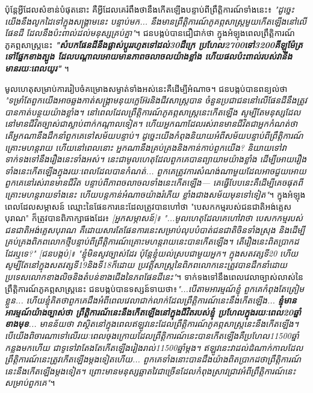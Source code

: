 \documentclass[10pt,twocolumn,letterpaper]{article}
\begin{document}
	ប៉ុន្តែអ្វីដែលសំខាន់បំផុតនោះ គឺអ្វីដែលគេរំពឹងថានឹងកើតឡើងបន្ទាប់ពីព្រឹត្តិការណ៍ទាំងនេះ៖ \textit{"ដូច្នេះយើងនឹងលូកដៃទៅក្នុងសង្គ្រាមនេះ បន្ទាប់មក... នឹងមានព្រឹត្តិការណ៍ភូគព្ភសាស្ត្រមួយកើតឡើងនៅលើផែនដី ដែលនឹងប៉ះពាល់ដល់មនុស្សគ្រប់គ្នា"}\cite{4}។ ជនបង្កប់បានជឿជាក់ថា ក្នុងអំឡុងពេលព្រឹត្តិការណ៍ភូគព្ភសាស្ត្រនេះ \textit{\textbf{"សំបកផែនដីនឹងផ្លាស់ប្តូររហូតទៅដល់30ដឺក្រេ ប្រហែល2700ទៅ3200គីឡូម៉ែត្រទៅផ្នែកខាងត្បូង ដែលបណ្តាលអោយមានភាពចលាចលយ៉ាងខ្លាំង ហើយផលប៉ះពាល់របស់វានឹងមានរយៈពេលយូរ" }}\cite{4}។

	មូលហេតុសម្រាប់ការរៀបចំគម្រោងសម្ងាត់ទាំងអស់នេះគឺដើម្បីអំណាច។ ជនបង្កប់បានពន្យល់ថា \textit{"ទម្រាំតែពួកយើងអាចឆ្លងកាត់សង្គ្រាមនុយក្លេអ៊ែរនិងជីវសាស្ត្របាន ចំនួនប្រជាជននៅលើផែនដីនឹងត្រូវបានកាត់បន្ថយយ៉ាងខ្លាំង។ នៅពេលដែលព្រឹត្តិការណ៍ភូគព្ភសាស្ត្រនេះកើតឡើង សូម្បីតែមនុស្សដែលនៅមានជីវិតច្បាស់ជាស្លាប់ពាក់កណ្តាលទៀត។ ហើយអ្នកណាដែលរស់រានមានជីវិតជាអ្នកកំណត់ថា តើអ្នកណានឹងដឹកនាំពួកគេទៅសម័យបន្ទាប់។ ដូច្នេះយើងកំពុងនិយាយអំពីសម័យបន្ទាប់ពីព្រឹត្តិការណ៍គ្រោះមហន្តរាយ ហើយនៅពេលនោះ អ្នកណានឹងគ្រប់គ្រងនិងកាន់កាប់ពួកយើង? និយាយទៅវាទាក់ទងទៅនឹងរឿងនេះទាំងអស់។ នេះជាមូលហេតុដែលពួកគេបានព្យាយាមយ៉ាងខ្លាំង ដើម្បីអោយរឿងទាំងនេះកើតឡើងក្នុងរយៈពេលដែលបានកំណត់... ពួកគេត្រូវការសំណង់ណាមួយដែលអាចជួយអោយពួកគេនៅរស់រានមានជីវិត បន្ទាប់ពីភាពចលាចលទាំងនេះកើតឡើង— គេធ្វើបែបនេះគឺដើម្បីគេចផុតពីគ្រោះមហន្តរាយទាំងនេះ ហើយបន្តកាន់អំណាចយ៉ាងរំភើយ ខ្លាំងជាងសម័យមុនទៅទៀត"}\cite{4}។ ក្នុងអំឡុងពេលដែលសម្ភាសន៍ ឈ្មោះនៃផែនការនេះដែលត្រូវបានហៅថា "បេសកកម្មរបស់ជនជាតិអង់គ្លេសបុរាណ" ក៏ត្រូវបានពិភាក្សាផងដែរ៖ \textit{[អ្នកសម្ភាសន៍]៖ "...មូលហេតុដែលគេហៅវាថា បេសកកម្មរបស់ជនជាតិអង់គ្លេសបុរាណ គឺដោយសារតែផែនការនេះសម្រាប់លុបបំបាត់ជនជាតិចិនទាំងស្រុង និងដើម្បីគ្រប់គ្រងពិភពលោកថ្មី​បន្ទាប់ពីព្រឹត្តិការណ៍គ្រោះមហន្តរាយនេះបានកើតឡើង។  តើរឿងនេះពិតប្រាកដដែរឬទេ?" [ជនបង្កប់]៖ "ខ្ញុំមិនសូវច្បាស់ដែរ ប៉ុន្តែខ្ញុំយល់ស្របជាមួយអ្នក​។ ក្នុងសតវត្សទី20  ហើយសូម្បីតែនៅក្នុងសតវត្សទី19និងទី18ក៏ដោយ ប្រវត្តិសាស្ត្រនៃពិភពលោកនេះត្រូវបានដឹកនាំដោយប្រទេសលោកខាងលិចនិងតំបន់ខាងជើងនៃភពផែនដីនេះ"}\cite{4}។
ទាក់ទងទៅនឹងពេលវេលាច្បាស់លាស់នៃព្រឹត្តិការណ៍ភូគព្ភសាស្ត្រនេះ ជនបង្កប់បានទស្សន៍ទាយថា៖\textit{"...បើតាមអារម្មណ៍ខ្ញុំ ពួកគេកំពុងតែត្រៀមខ្លួន... ហើយខ្ញុំគិតថាពួកគេដឹងអំពីពេលវេលាជាក់លាក់ដែលព្រឹត្តិការណ៍នេះនឹងកើតឡើង... \textbf{ខ្ញុំមានអារម្មណ៍យ៉ាងច្បាស់ថា ​ព្រឹត្តិការណ័នេះនឹងកើតឡើងនៅក្នុងជីវិតរបស់ខ្ញុំ ប្រហែលក្នុងរយៈពេល20ឆ្នាំខាងមុខ}... មានន័យថា វាស្ថិតនៅក្នុងពេលឥឡូវនេះដែលព្រឹត្តិការណ៍ភូគព្ភសាស្ត្រនេះនឹងកើតឡើង។ បើយើងពិចារណាទៅលើរយៈពេលចុងក្រោយដែលព្រឹត្តិការណ៍នេះបានកើតឡើងគឺប្រហែល11500ឆ្នាំកន្លងមកហើយ ជាទូទៅវាតែងតែកើតឡើងរៀងរាល់11500ឆ្នាំម្ដង។ ឥឡូវនេះវាដល់ដំណាក់កាលដែលព្រឹតិ្តការណ៍នេះត្រូវកើតឡើងម្តងទៀតហើយ... ពួកគេទាំងនោះបានដឹងយ៉ាងពិតប្រាកដថាព្រឹត្តិការណ៍នេះនឹងកើតឡើងម្តងទៀត។ ព្រោះមានមនុស្សឆ្លាតវៃជាច្រើនដែលកំពុងស្រាវជ្រាវអំពីព្រឹត្តិការណ៍នេះសម្រាប់ពួកគេ"}\cite{4}។
\end{document}
